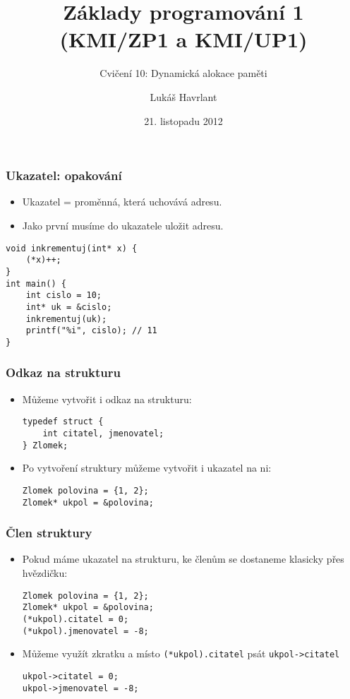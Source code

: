 \documentclass{beamer}
\title{Základy programování 1 (KMI/ZP1 a KMI/UP1)}
\subtitle{Cvičení 10: Dynamická alokace paměti}
\author{Lukáš Havrlant}
\date{21. listopadu 2012}
\institute{Univerzita Palackého}
\newenvironment{itemizex}%
  {\large \begin{itemize}%
    \setlength{\itemsep}{8pt}%
    \setlength{\parskip}{8pt}}%
  {\end{itemize}}
\begin{document}
\begin{frame}[t,plain]
\titlepage
\end{frame}


\begin{frame}[t,fragile]\frametitle{Ukazatel: opakování} 
    \begin{itemizex}
        \item Ukazatel = proměnná, která uchovává adresu.
        \item Jako první musíme do ukazatele uložit adresu.
    \end{itemizex}

    \begin{verbatim}
void inkrementuj(int* x) {
    (*x)++;
}
int main() {
    int cislo = 10;
    int* uk = &cislo;
    inkrementuj(uk);
    printf("%i", cislo); // 11
}    
\end{verbatim}
\end{frame}


\begin{frame}[t,fragile]\frametitle{Odkaz na strukturu} 
    \begin{itemizex}
        \item Můžeme vytvořit i odkaz na strukturu:
        \begin{verbatim} 
typedef struct {
    int citatel, jmenovatel;
} Zlomek;
        \end{verbatim}
        \item Po vytvoření struktury můžeme vytvořit i ukazatel na ni:
        \begin{verbatim} 
Zlomek polovina = {1, 2};
Zlomek* ukpol = &polovina;
        \end{verbatim}
    \end{itemizex}
\end{frame}


\begin{frame}[t,fragile]\frametitle{Člen struktury} 
    \begin{itemizex}
        \item Pokud máme ukazatel na strukturu, ke členům se dostaneme klasicky přes hvězdičku:
        \begin{verbatim} 
Zlomek polovina = {1, 2};
Zlomek* ukpol = &polovina;
(*ukpol).citatel = 0;
(*ukpol).jmenovatel = -8;
        \end{verbatim}
        \item Můžeme využít zkratku a místo \texttt{(*ukpol).citatel} psát \texttt{ukpol->citatel}
        \begin{verbatim} 
ukpol->citatel = 0;
ukpol->jmenovatel = -8;
        \end{verbatim}
    \end{itemizex}
\end{frame}
\end{document}
